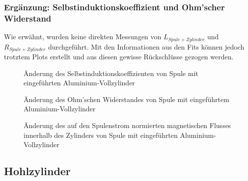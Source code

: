 \subsubsection{Erg\"anzung: Selbstinduktionskoeffizient und Ohm'scher Widerstand}
\label{sec:ausw:subsec:vollz:subsubsec:LR}

Wie  erw\"ahnt, wurden  keine direkten  Messungen von  $L_{Spule +  Zylinder}$
und  $R_{Spule  + Zylinder}$  durchgef\"uhrt. Mit  den  Informationen aus  den
Fits  k\"onnen  jedoch   trotztem  Plots  erstellt  und   aus  diesen  gewisse
R\"uckschl\"usse gezogen werden.

\begin{figure}[h!]
    \resizebox{\textwidth}{!}{}
    \caption{\"Anderung des Selbstinduktionskoeffizienten von Spule mit eingef\"uhrten Aluminium-Vollzylinder}
\end{figure}
\begin{figure}[h!]
    \resizebox{\textwidth}{!}{}
    \caption{\"Anderung des Ohm'schen Widerstandes von Spule mit eingef\"uhrtem Aluminium-Vollzylinder}
\end{figure}
\begin{figure}[h!]
    \resizebox{\textwidth}{!}{}
    \caption{\"Anderung des auf den Spulenstrom normierten magnetischen Flusses innerhalb des Zylinders von Spule mit eingef\"uhrten Aluminium-Vollzylinder}
\end{figure}


\clearpage
\subsection{Hohlzylinder}
\label{sec:ausw:subsec:hohlz}


